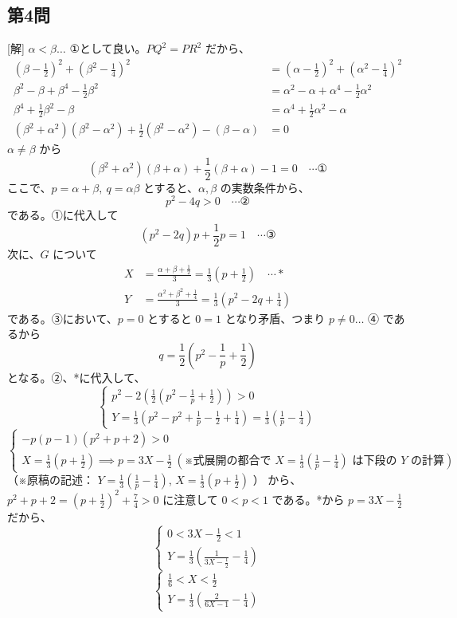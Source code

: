 \documentclass[../main.tex]{subfiles}
\begin{document}
\subsection*{第4問}
[解] $\alpha < \beta \dots$ ①として良い。$PQ^2 = PR^2$ だから、
\begin{align*}
  (\beta - \frac{1}{2})^2 + (\beta^2 - \frac{1}{4})^2 &= (\alpha - \frac{1}{2})^2 + (\alpha^2 - \frac{1}{4})^2 \\
  \beta^2 - \beta + \beta^4 - \frac{1}{2}\beta^2 &= \alpha^2 - \alpha + \alpha^4 - \frac{1}{2}\alpha^2 \\
  \beta^4 + \frac{1}{2}\beta^2 - \beta &= \alpha^4 + \frac{1}{2}\alpha^2 - \alpha \\
  (\beta^2 + \alpha^2)(\beta^2 - \alpha^2) + \frac{1}{2}(\beta^2 - \alpha^2) - (\beta - \alpha) &= 0
\end{align*}
$\alpha \neq \beta$ から
\[ (\beta^2 + \alpha^2)(\beta + \alpha) + \frac{1}{2}(\beta + \alpha) - 1 = 0 \quad \cdots \text{①} \]
ここで、$p = \alpha + \beta, \ q = \alpha \beta$ とすると、$\alpha, \beta$ の実数条件から、
\[ p^2 - 4q > 0 \quad \cdots \text{②} \]
である。①に代入して
\[ (p^2 - 2q)p + \frac{1}{2}p = 1 \quad \cdots \text{③} \]
次に、$G$ について
\begin{align*}
  X &= \frac{\alpha+\beta+\frac{1}{2}}{3} = \frac{1}{3}(p+\frac{1}{2}) \quad \cdots * \\
  Y &= \frac{\alpha^2+\beta^2+\frac{1}{4}}{3} = \frac{1}{3}(p^2-2q+\frac{1}{4})
\end{align*}
である。③において、$p=0$ とすると $0=1$ となり矛盾、つまり $p \neq 0 \dots$ ④ であるから
\[ q = \frac{1}{2} \left( p^2 - \frac{1}{p} + \frac{1}{2} \right) \]
となる。②、*に代入して、
\[
  \begin{cases}
    p^2 - 2 \left( \frac{1}{2}(p^2 - \frac{1}{p} + \frac{1}{2}) \right) > 0 \\
    Y = \frac{1}{3} \left( p^2 - p^2 + \frac{1}{p} - \frac{1}{2} + \frac{1}{4} \right) = \frac{1}{3}(\frac{1}{p} - \frac{1}{4})
\end{cases} \]
\[
  \begin{cases}
    -p(p-1)(p^2+p+2) > 0 \\
    X = \frac{1}{3}(p+\frac{1}{2}) \implies p = 3X - \frac{1}{2} \ (\text{※式展開の都合で } X = \frac{1}{3}(\frac{1}{p}-\frac{1}{4}) \text{ は下段の } Y \text{ の計算})
\end{cases} \]
（※原稿の記述： $Y = \frac{1}{3}(\frac{1}{p}-\frac{1}{4})$, $X = \frac{1}{3}(p+\frac{1}{2})$ ）
から、$p^2+p+2 = (p+\frac{1}{2})^2 + \frac{7}{4} > 0$ に注意して $0 < p < 1$ である。*から $p = 3X - \frac{1}{2}$ だから、
\[
  \begin{cases}
    0 < 3X - \frac{1}{2} < 1 \\
    Y = \frac{1}{3} \left( \frac{1}{3X-\frac{1}{2}} - \frac{1}{4} \right)
\end{cases} \]
\[
  \begin{cases}
    \frac{1}{6} < X < \frac{1}{2} \\
    Y = \frac{1}{3} \left( \frac{2}{6X-1} - \frac{1}{4} \right)
\end{cases} \]
\end{document}
